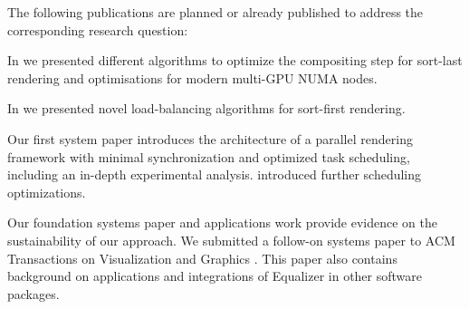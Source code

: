 The following publications are planned or already published to address the corresponding research question:
\begin{compactenum}
    \item
    \begin{compactenum}
        \item In \cite{EP:07, MEP:10, EBAHMP:12} we presented different algorithms to optimize the compositing step for sort-last rendering and optimisations for modern multi-GPU NUMA nodes.
        \item In \cite{EEP:11, SPEP:16} we presented novel load-balancing algorithms for sort-first rendering.
    \end{compactenum}
    \item Our first system paper \cite{EMP:09} introduces the architecture of a parallel rendering framework with minimal synchronization and optimized task scheduling, including an in-depth experimental analysis. \cite{EBAHMP:12} introduced further scheduling optimizations.
    \item Our foundation systems paper \cite{EMP:09} and applications work \cite{HBBES:13} provide evidence on the sustainability of our approach. We submitted a follow-on systems paper to ACM Transactions on Visualization and Graphics \cite{ESP:18}. This paper also contains background on applications and integrations of Equalizer in other software packages.
\end{compactenum}

